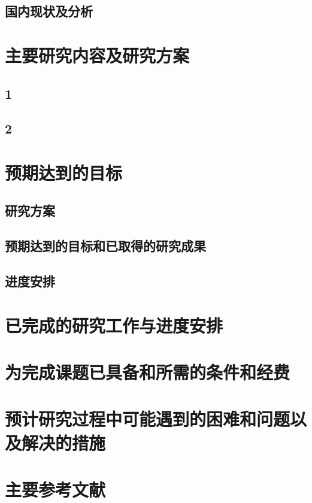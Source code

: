 \subsection{国内现状及分析}
\section{主要研究内容及研究方案}
\subsection{1}
\subsection{2}
\section{预期达到的目标}
\subsection{研究方案}
\subsection{预期达到的目标和已取得的研究成果}
\subsection{进度安排}
\section{已完成的研究工作与进度安排}
\section{为完成课题已具备和所需的条件和经费}
\section{预计研究过程中可能遇到的困难和问题以及解决的措施}
\section{主要参考文献}



